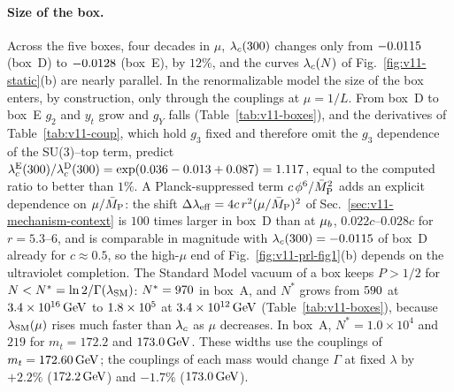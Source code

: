 \paragraph{Size of the box.}
Across the five boxes, four decades in $\mu$, $\lambda_c(300)$ changes only from $-0.0115$ (box~D) to $-0.0128$ (box~E), by $12\%$, and the curves $\lambda_c(N)$ of Fig.~\ref{fig:v11-static}(b) are nearly parallel. %
In the renormalizable model the size of the box enters, by construction, only through the couplings at $\mu=1/L$.
From box~D to box~E $g_2$ and $y_t$ grow and $g_Y$ falls (Table~\ref{tab:v11-boxes}), and the derivatives of Table~\ref{tab:v11-coup}, which hold $g_3$ fixed and therefore omit the $g_3$ dependence of the SU(3)--top term, predict $\lambda_c^{\rm E}(300)/\lambda_c^{\rm D}(300)=\exp(0.036-0.013+0.087)=1.117$, equal to the computed ratio to better than $1\%$. %
A Planck-suppressed term $c\,\phi^6/\bar M_{\mathrm{P}}^2$ adds an explicit dependence on $\mu/\bar M_{\mathrm{P}}$: the shift $\Delta\lambda_{\rm eff}=4c\,r^2(\mu/\bar M_{\mathrm{P}})^2$ of Sec.~\ref{sec:v11-mechanism-context} is $100$ times larger in box~D than at $\mu_b$, $0.022c$--$0.028c$ for $r=5.3$--$6$, and is comparable in magnitude with $\lambda_c(300)=-0.0115$ of box~D already for $c\approx0.5$, so the high-$\mu$ end of Fig.~\ref{fig:v11-prl-fig1}(b) depends on the ultraviolet completion. %
The Standard Model vacuum of a box keeps $P>1/2$ for $N<N^*=\ln2/\Gamma(\lambda_{\rm SM})$: $N^*=970$ in box~A, and $N^*$ grows from $590$ at $3.4\times10^{16}\,\mathrm{GeV}$ to $1.8\times10^5$ at $3.4\times10^{12}\,\mathrm{GeV}$ (Table~\ref{tab:v11-boxes}), because $\lambda_{\rm SM}(\mu)$ rises much faster than $\lambda_c$ as $\mu$ decreases. %
In box~A, $N^*=1.0\times10^4$ and $219$ for $m_t=172.2$ and $173.0\,\mathrm{GeV}$. %
These widths use the couplings of $m_t=172.60\,\mathrm{GeV}$; the couplings of each mass would change $\Gamma$ at fixed $\lambda$ by $+2.2\%$ ($172.2\,\mathrm{GeV}$) and $-1.7\%$ ($173.0\,\mathrm{GeV}$). %

